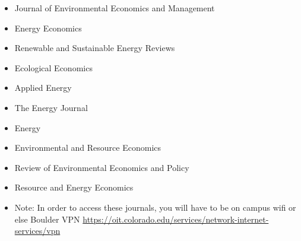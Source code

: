 \documentclass[11pt]{article}
\begin{document}
\begin{enumerate}
\begin{itemize}
            \item Journal of Environmental Economics and Management
            
            \item Energy Economics
            
            \item Renewable and Sustainable Energy Reviews
            
            \item Ecological Economics
            
            \item Applied Energy
            
            \item The Energy Journal
            
            \item Energy
            
            \item Environmental and Resource Economics
            
            \item Review of Environmental Economics and Policy
            
            \item Resource and Energy Economics
            
            \item Note: In order to access these journals, you will have to be on campus wifi or else Boulder VPN \href{https://oit.colorado.edu/services/network-internet-services/vpn}{https://oit.colorado.edu/services/network-internet-services/vpn}
        \end{itemize}
    
\end{enumerate}
    
\end{document}
